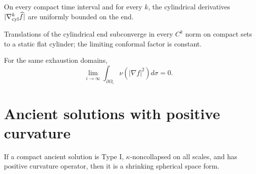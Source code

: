 \begin{lemma}[Higher derivative bounds for \(\widehat f=-\log\widehat u\)]
\label{lem:chow-iv-conformal-factor-derivatives}
On every compact time interval and for every \(k\), the cylindrical derivatives
\(|\nabla^k_{\rm cyl}\widehat f|\) are uniformly bounded on the end.
\end{lemma}

\begin{lemma}
\label{lem:chow-iv-pointwise-flat-cylinder}
Translations of the cylindrical end subconverge in every \(C^k\) norm on
compact sets to a static flat cylinder; the limiting conformal factor is constant.
\end{lemma}

\begin{lemma}
\label{lem:chow-iv-second-boundary-term}
For the same exhaustion domains,
\[
\lim_{i\to\infty}\int_{\partial\Omega_i}\nu(|\nabla f|^2)d\sigma=0.
\]
\end{lemma}

\section{Ancient solutions with positive curvature}

\begin{theorem}
\label{thm:chow-iv-type-i-pco}
If a compact ancient solution is Type I, \(\kappa\)-noncollapsed on all
scales, and has positive curvature operator, then it is a shrinking spherical
space form.
\end{theorem}

